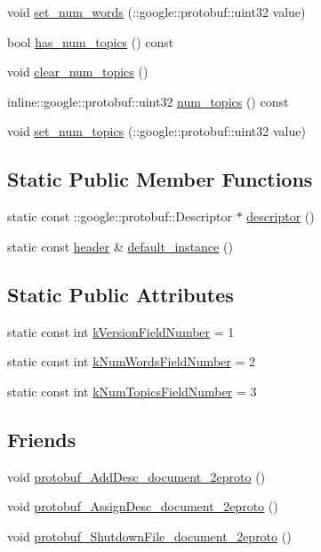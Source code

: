 \begin{DoxyCompactItemize}
\item 
void \hyperlink{class_l_d_a_1_1header_a42f82bbe26a9cf2a0c75480a5b15701f}{set\_\-num\_\-words} (::google::protobuf::uint32 value)
\item 
bool \hyperlink{class_l_d_a_1_1header_a6503c56af69b39da3f325c58d062417a}{has\_\-num\_\-topics} () const 
\item 
void \hyperlink{class_l_d_a_1_1header_a591a1b1e2dc7b62f6f06b9cb2d0d28bf}{clear\_\-num\_\-topics} ()
\item 
inline::google::protobuf::uint32 \hyperlink{class_l_d_a_1_1header_aa766b8cbb2048e43848cef4a52002752}{num\_\-topics} () const 
\item 
void \hyperlink{class_l_d_a_1_1header_aecfa2cccbc1b54a16c68b3d685e5c63c}{set\_\-num\_\-topics} (::google::protobuf::uint32 value)
\end{DoxyCompactItemize}
\subsection*{Static Public Member Functions}
\begin{DoxyCompactItemize}
\item 
static const ::google::protobuf::Descriptor $\ast$ \hyperlink{class_l_d_a_1_1header_ad6bb3d8bcef004268dd63526606ad08a}{descriptor} ()
\item 
static const \hyperlink{class_l_d_a_1_1header}{header} \& \hyperlink{class_l_d_a_1_1header_ab2cc2ceeda340e84675d0194a700230e}{default\_\-instance} ()
\end{DoxyCompactItemize}
\subsection*{Static Public Attributes}
\begin{DoxyCompactItemize}
\item 
static const int \hyperlink{class_l_d_a_1_1header_ad9b0bbfc947d7b6dc37a89ab69f9ff5f}{kVersionFieldNumber} = 1
\item 
static const int \hyperlink{class_l_d_a_1_1header_a947277b31db705577059029c9ae305c5}{kNumWordsFieldNumber} = 2
\item 
static const int \hyperlink{class_l_d_a_1_1header_a3e4e67c2abbd89bf59dcb6a58a5e93f4}{kNumTopicsFieldNumber} = 3
\end{DoxyCompactItemize}
\subsection*{Friends}
\begin{DoxyCompactItemize}
\item 
void \hyperlink{class_l_d_a_1_1header_a9ca7998089dddfe828221d1f41bf4f9c}{protobuf\_\-AddDesc\_\-document\_\-2eproto} ()
\item 
void \hyperlink{class_l_d_a_1_1header_a5c1ac521cee58e6270c99a8c012c8950}{protobuf\_\-AssignDesc\_\-document\_\-2eproto} ()
\item 
void \hyperlink{class_l_d_a_1_1header_af79773dc456499799fb950f62b8cd291}{protobuf\_\-ShutdownFile\_\-document\_\-2eproto} ()
\end{DoxyCompactItemize}


